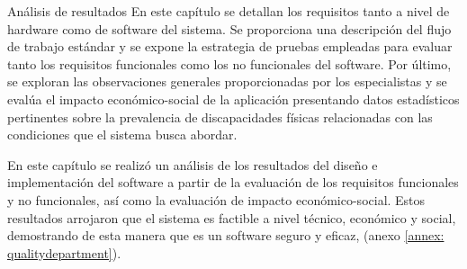 \begin{thesischapter}{3} {Análisis de resultados}
En este capítulo se detallan los requisitos tanto a nivel de hardware como de software del sistema. Se proporciona una descripción del flujo de trabajo estándar y se expone la estrategia de pruebas empleadas para evaluar tanto los requisitos funcionales como los no funcionales del software. Por último, se exploran las observaciones generales proporcionadas por los especialistas y se evalúa el impacto económico-social de la aplicación presentando datos estadísticos pertinentes sobre la prevalencia de discapacidades físicas relacionadas con las condiciones que el sistema busca abordar.









En este capítulo se realizó un análisis de los resultados del diseño e implementación del software a partir de la  evaluación de los requisitos funcionales y no funcionales, así como la evaluación  de impacto económico-social. Estos resultados arrojaron que el sistema es factible a nivel técnico, económico y social, demostrando de esta manera que es un software seguro y eficaz, (anexo \ref{annex: qualitydepartment}).
\end{thesischapter}